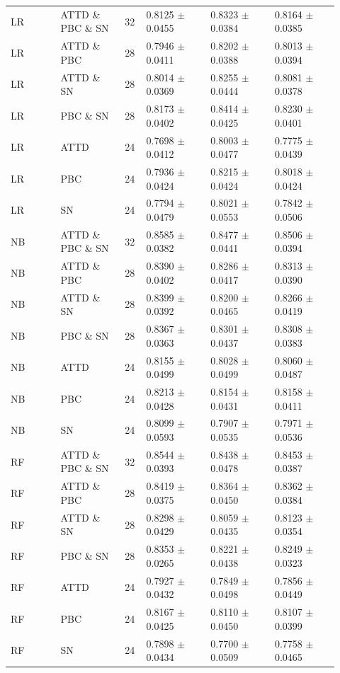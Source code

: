 \documentclass[10pt,a4paper]{article}
\newcommand{\classifiersep}{\addlinespace[1pt]\midrule\addlinespace[1pt]}
\begin{document}
\begin{landscape}
\begin{longtable}{@{}L{0.14\linewidth}L{0.18\linewidth}C{0.06\linewidth}C{0.18\linewidth}C{0.18\linewidth}C{0.18\linewidth}@{}}
LR & ATTD \& PBC \& SN & 32 & 0.8125 $\pm$ 0.0455 & 0.8323 $\pm$ 0.0384 & 0.8164 $\pm$ 0.0385 \\
LR & ATTD \& PBC & 28 & 0.7946 $\pm$ 0.0411 & 0.8202 $\pm$ 0.0388 & 0.8013 $\pm$ 0.0394 \\
LR & ATTD \& SN & 28 & 0.8014 $\pm$ 0.0369 & 0.8255 $\pm$ 0.0444 & 0.8081 $\pm$ 0.0378 \\
LR & PBC \& SN & 28 & 0.8173 $\pm$ 0.0402 & 0.8414 $\pm$ 0.0425 & 0.8230 $\pm$ 0.0401 \\
LR & ATTD & 24 & 0.7698 $\pm$ 0.0412 & 0.8003 $\pm$ 0.0477 & 0.7775 $\pm$ 0.0439 \\
LR & PBC & 24 & 0.7936 $\pm$ 0.0424 & 0.8215 $\pm$ 0.0424 & 0.8018 $\pm$ 0.0424 \\
LR & SN & 24 & 0.7794 $\pm$ 0.0479 & 0.8021 $\pm$ 0.0553 & 0.7842 $\pm$ 0.0506 \\
\classifiersep
NB & ATTD \& PBC \& SN & 32 & 0.8585 $\pm$ 0.0382 & 0.8477 $\pm$ 0.0441 & 0.8506 $\pm$ 0.0394 \\
NB & ATTD \& PBC & 28 & 0.8390 $\pm$ 0.0402 & 0.8286 $\pm$ 0.0417 & 0.8313 $\pm$ 0.0390 \\
NB & ATTD \& SN & 28 & 0.8399 $\pm$ 0.0392 & 0.8200 $\pm$ 0.0465 & 0.8266 $\pm$ 0.0419 \\
NB & PBC \& SN & 28 & 0.8367 $\pm$ 0.0363 & 0.8301 $\pm$ 0.0437 & 0.8308 $\pm$ 0.0383 \\
NB & ATTD & 24 & 0.8155 $\pm$ 0.0499 & 0.8028 $\pm$ 0.0499 & 0.8060 $\pm$ 0.0487 \\
NB & PBC & 24 & 0.8213 $\pm$ 0.0428 & 0.8154 $\pm$ 0.0431 & 0.8158 $\pm$ 0.0411 \\
NB & SN & 24 & 0.8099 $\pm$ 0.0593 & 0.7907 $\pm$ 0.0535 & 0.7971 $\pm$ 0.0536 \\
\classifiersep
RF & ATTD \& PBC \& SN & 32 & 0.8544 $\pm$ 0.0393 & 0.8438 $\pm$ 0.0478 & 0.8453 $\pm$ 0.0387 \\
RF & ATTD \& PBC & 28 & 0.8419 $\pm$ 0.0375 & 0.8364 $\pm$ 0.0450 & 0.8362 $\pm$ 0.0384 \\
RF & ATTD \& SN & 28 & 0.8298 $\pm$ 0.0429 & 0.8059 $\pm$ 0.0435 & 0.8123 $\pm$ 0.0354 \\
RF & PBC \& SN & 28 & 0.8353 $\pm$ 0.0265 & 0.8221 $\pm$ 0.0438 & 0.8249 $\pm$ 0.0323 \\
RF & ATTD & 24 & 0.7927 $\pm$ 0.0432 & 0.7849 $\pm$ 0.0498 & 0.7856 $\pm$ 0.0449 \\
RF & PBC & 24 & 0.8167 $\pm$ 0.0425 & 0.8110 $\pm$ 0.0450 & 0.8107 $\pm$ 0.0399 \\
RF & SN & 24 & 0.7898 $\pm$ 0.0434 & 0.7700 $\pm$ 0.0509 & 0.7758 $\pm$ 0.0465 \\

\end{longtable}
\end{landscape}
\end{document}
